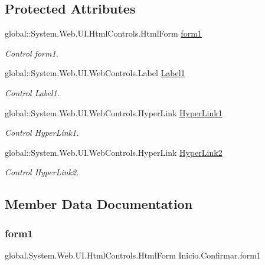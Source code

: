 \subsection*{Protected Attributes}
\begin{DoxyCompactItemize}
\item 
global\+::\+System.\+Web.\+U\+I.\+Html\+Controls.\+Html\+Form \mbox{\hyperlink{class_inicio_1_1_confirmar_a30f1390871512f4d2eb2a6e5a635f9f5}{form1}}
\begin{DoxyCompactList}\small\item\em Control form1. \end{DoxyCompactList}\item 
global\+::\+System.\+Web.\+U\+I.\+Web\+Controls.\+Label \mbox{\hyperlink{class_inicio_1_1_confirmar_a0422c86bf977b315fd681b02c0f5f352}{Label1}}
\begin{DoxyCompactList}\small\item\em Control Label1. \end{DoxyCompactList}\item 
global\+::\+System.\+Web.\+U\+I.\+Web\+Controls.\+Hyper\+Link \mbox{\hyperlink{class_inicio_1_1_confirmar_aa4a4ab67f1e6964cdc3e83eb66293fa9}{Hyper\+Link1}}
\begin{DoxyCompactList}\small\item\em Control Hyper\+Link1. \end{DoxyCompactList}\item 
global\+::\+System.\+Web.\+U\+I.\+Web\+Controls.\+Hyper\+Link \mbox{\hyperlink{class_inicio_1_1_confirmar_adbc12b387c3590f83453888d8192db9a}{Hyper\+Link2}}
\begin{DoxyCompactList}\small\item\em Control Hyper\+Link2. \end{DoxyCompactList}\end{DoxyCompactItemize}


\subsection{Member Data Documentation}
\mbox{\label{class_inicio_1_1_confirmar_a30f1390871512f4d2eb2a6e5a635f9f5}} 
\subsubsection{\texorpdfstring{form1}{form1}}
{\footnotesize\ttfamily global.\+System.\+Web.\+U\+I.\+Html\+Controls.\+Html\+Form Inicio.\+Confirmar.\+form1\hspace{0.3cm}{\ttfamily [protected]}}



